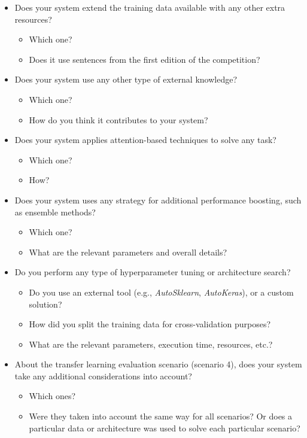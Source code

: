 \documentclass[]{llncs}
\begin{document}
\begin{itemize}
\begin{itemize}
        \end{itemize}
    \item Does your system extend the training data available with any other extra resources?
        \begin{itemize}
            \item Which one?
            \item Does it use sentences from the first edition of the competition?
        \end{itemize}
    \item Does your system use any other type of external knowledge?
        \begin{itemize}
            \item Which one?
            \item How do you think it contributes to your system?
        \end{itemize}
    \item Does your system applies attention-based techniques to solve any task?
        \begin{itemize}
            \item Which one?
            \item How?
        \end{itemize}
    \item Does your system uses any strategy for additional performance boosting, such as ensemble methods?
        \begin{itemize}
            \item Which one?
            \item What are the relevant parameters and overall details?
        \end{itemize}
    \item Do you perform any type of hyperparameter tuning or architecture search?
        \begin{itemize}
            \item Do you use an external tool (e.g., \textit{AutoSklearn}, \textit{AutoKeras}), or a 
                  custom solution?
            \item How did you split the training data for cross-validation purposes?
            \item What are the relevant parameters, execution time, resources, etc.?
        \end{itemize}
    \item About the transfer learning evaluation scenario (scenario 4), does your system take any additional considerations into account?
        \begin{itemize}
            \item Which ones?
            \item Were they taken into account the same way for all scenarios? Or does a particular data or architecture was used to solve each particular scenario?
        \end{itemize}
\end{itemize}
\end{document}
